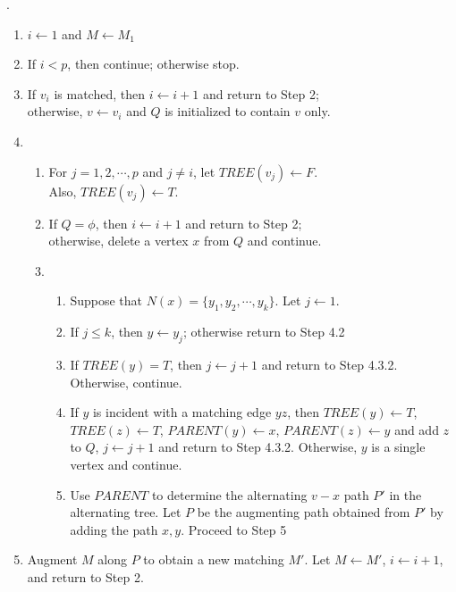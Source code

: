 \begin{algorithm}.
	\begin{enumerate}
		\item $ i \leftarrow 1$ and $M \leftarrow M_1$
		\item If $i < p$, then continue; otherwise stop.
		\item If $v_i$ is matched, then $i \leftarrow i+1$ and return to Step 2;\\
			otherwise, $v \leftarrow v_i$ and $Q$ is initialized to contain $v$ only.
		\item 
			\begin{enumerate}[label=(\arabic*)]
				\item For $j = 1,2,\cdots,p$ and $j \ne i$, let $TREE(v_j) \leftarrow F$.\\
					Also, $TREE(v_j) \leftarrow T$.
				\item If $Q = \phi$, then $i \leftarrow i+1$ and return to Step 2;\\
					otherwise, delete a vertex $x$ from $Q$ and continue.
				\item 
					\begin{enumerate}[label=(\arabic*)]
						\item Suppose that $N(x) = \{y_1,y_2,\cdots,y_k\}$.
							Let $j \leftarrow 1$.
						\item If $j \le k$, then $y \leftarrow y_j$; otherwise return to Step 4.2
						\item If $TREE(y) = T$, then $j \leftarrow j+1$ and return to Step 4.3.2. Otherwise, continue.
						\item If $y$ is incident with a matching edge $yz$, then $TREE(y) \leftarrow T$, $TREE(z) \leftarrow T$, $PARENT(y) \leftarrow x$, $PARENT(z) \leftarrow y$ and add $z$ to $Q$, $j \leftarrow j+1$ and return to Step 4.3.2. Otherwise, $y$ is a single vertex and continue.
						\item Use $PARENT$ to determine the alternating $v-x$ path $P'$ in the alternating tree.
							Let $P$ be the augmenting path obtained from $P'$ by adding the path $x,y$.
							Proceed to Step 5
					\end{enumerate}
			\end{enumerate}
		\item Augment $M$ along $P$ to obtain a new matching $M'$.
			Let $M \leftarrow M'$, $i \leftarrow i+1$, and return to Step 2.
	\end{enumerate}
	\label{alg:maxmatching}
\end{algorithm}

